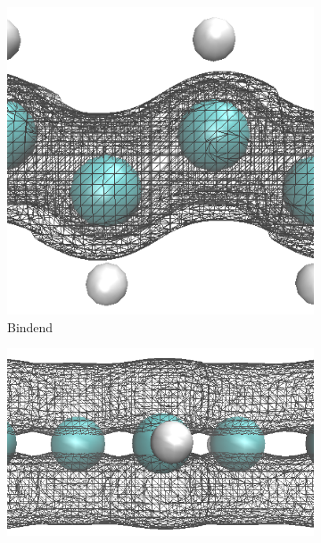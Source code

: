 \begin{frame}
\begin{figure}
	\centering
	\begin{subfigure}{0.25\textwidth}
	\includegraphics[width = \textwidth]{Images/polyacetylene/wavefunctions/Mid_band_2_Cut}
	\caption{Bindend}
	\label{image_homo1}
	\end{subfigure}\hspace*{2cm}
	\begin{subfigure}{0.41\textwidth}
	\centering
	\includegraphics[width = \textwidth]{Images/polyacetylene/wavefunctions/Mid_band_2_Side_View_Cut}

\end{subfigure}
\end{figure}
\end{frame}
